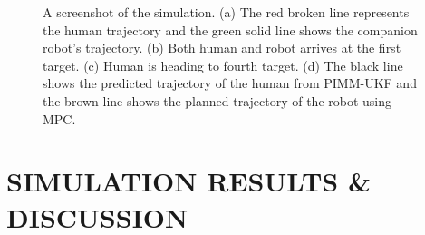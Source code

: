 \documentclass[journal]{IEEEtran}
\newcommand{\todonote}[1]{\vspace{0px} %
	\todo[inline, color=green!30]{\textbf{[Note:]} {#1}} %
}
\DeclareRobustCommand{\dhnote}[1]{\ifthenelse{\boolean{include-notes}}%
{\textcolor{blue}{\textbf{DH: #1}}}{}}
\DeclareRobustCommand{\grnote}[1]{\ifthenelse{\boolean{include-notes}}%
{\textcolor{purple}{\textbf{GR: #1}}}{}}
\begin{document}
\begin{figure}
\begin{subfigure}{0.23\textwidth}
			\caption{}
			\label{fig:ref_traj_accom}
		\end{subfigure}
		\caption{A screenshot of the simulation. (a) The red broken line represents the human trajectory and the green solid line shows the companion robot's trajectory. (b) Both human and robot arrives at the first target. (c) Human is heading to fourth target. (d) The black line shows the predicted trajectory of the human from PIMM-UKF and the brown line shows the planned trajectory of the robot using MPC.}
	\end{figure}		
    

	\section{SIMULATION RESULTS \& DISCUSSION}\label{sec:results}
    
    
\end{document}
